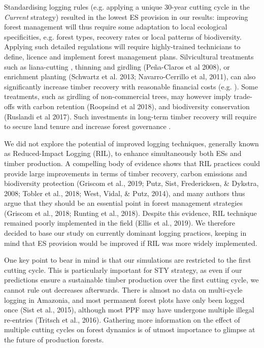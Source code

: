 \documentclass{article}
\begin{document}
Standardising logging rules (e.g. applying a unique 30-year cutting cycle in the \textit{Current} strategy) resulted in the lowest ES provision in our results: improving forest management will thus require some adaptation to local ecological specificities, e.g. forest types, recovery rates or local patterns of biodiversity. Applying such detailed regulations will require highly-trained technicians to define, licence and implement forest management plans. Silvicultural treatments such as liana-cutting \cite{Mills2019}, thinning and girdling (Peña-Claros et al 2008), or enrichment planting (Schwartz et al. 2013; Navarro-Cerrillo et al, 2011), can also significantly increase timber recovery with reasonable financial costs (e.g. \cite{Mills2019}). Some treatments, such as  girdling of non-commercial trees, may however imply trade-offs with carbon retention (Roopsind et al 2018), and biodiversity conservation (Ruslandi et al 2017). Such investments in long-term timber recovery will require to secure land tenure and increase forest governance \cite{Smith2006}. 

We did not explore the potential of improved logging techniques, generally known as Reduced-Impact Logging (RIL), to enhance simultaneously both ESs and timber production. A compelling body of evidence shows that RIL practices could provide large improvements in terms of timber recovery, carbon emissions and biodiversity protection (Griscom et al., 2019; Putz, Sist, Fredericksen, & Dykstra, 2008; Tobler et al., 2018; West, Vidal, & Putz, 2014), and many authors thus argue that they should be an essential point in forest management strategies (Griscom et al., 2018; Runting et al., 2018). Despite this evidence, RIL technique remained poorly implemented in the field (Ellis et al., 2019). We therefore decided to base our study on currently dominant logging practices, keeping in mind that ES provision would be improved if RIL was more widely implemented.

One key point to bear in mind is that our simulations are restricted to the first cutting cycle. This is particularly important for STY strategy, as even if our predictions ensure a sustainable timber production over the first cutting cycle, we cannot rule out decreases afterwards. There is almost no data on multi-cycle logging in Amazonia, and most permanent forest plots have only been logged once (Sist et al., 2015), although most PPF may have undergone multiple illegal re-entries (Tritsch et al., 2016). Gathering more information on the effect of multiple  cutting cycles on forest dynamics is of utmost importance to glimpse at the future of production forests.
\end{document}
